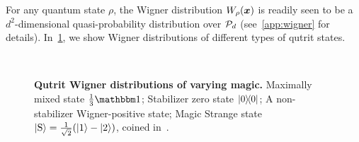 \documentclass[pra,
aps,
twocolumn,
superscriptaddress,
groupedaddress,
nofootinbib,
reprint
]{revtex4-1}
\begin{document}
For any quantum state $\rho$, the Wigner distribution $W_\rho(\bmx)$ is readily seen to be a $d^2$-dimensional quasi-probability distribution over $\cal{P}_d$ (see~\cref{app:wigner} for details).  In~\cref{fig:wstate_examples}, we show Wigner distributions of different types of qutrit states.
\begin{figure}%
    \centering
    \hspace{8pt}%
    \\
    \hspace{8pt}%
    \caption{\textbf{Qutrit Wigner distributions of varying magic.} 
     Maximally mixed state $\frac{1}{3}\id$;  Stabilizer zero state $\ketbra{0}{0}$;  A non-stabilizer Wigner-positive state;  Magic Strange state $\ket{{\rm{S}}} = \frac{1}{\sqrt{2}}(\ket{1} - \ket{2})$, coined in~\cite{cit:veitch2}.
    }%
    \label{fig:wstate_examples}
\end{figure}
\end{document}
